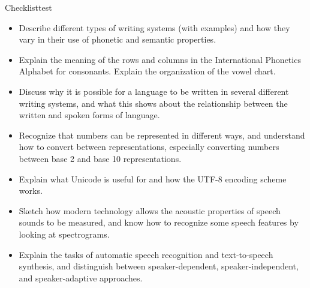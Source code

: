 





\begin{tblsfilledsymbol}{Checklist}{test}

\begin{itemize}
\item Describe different types of writing systems (with examples) and how they vary in
  their use of phonetic and semantic properties. 
  \item Explain the meaning of the rows and columns in the International Phonetics Alphabet for consonants.  Explain the organization of the vowel chart.
\item Discuss why it is possible for a language  to be written in several different writing systems, and what this shows about the relationship between the written and spoken forms of language.
\item Recognize that numbers can be represented in different ways, and 
understand how to convert between representations, especially
converting numbers between base 2 and base 10 representations.
\item Explain what Unicode is useful for and how the UTF-8 encoding
  scheme works.
\item Sketch how modern technology allows the acoustic properties of speech sounds to be measured, and 
know how to recognize some speech features by looking at spectrograms. 
\item Explain the tasks of automatic speech recognition and
  text-to-speech synthesis, and distinguish between speaker-dependent, speaker-independent, and speaker-adaptive approaches.
\end{itemize}

\end{tblsfilledsymbol}


